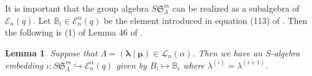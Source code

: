 \documentclass[10pt,a4,twoside,hidelinks,rm]{article}
\newcommand{\BB}{\mathbb{B}}
\newcommand{\Si}{\mathfrak{S}}
\newcommand{\E}{ {\mathcal E}_n(q)}
\newcommand{\Ea}{ {\mathcal E}_n^{\alpha}(q)}
\newcommand\blambda{{\boldsymbol\lambda}}
\newcommand\be{\mathbb{E}}
\newcommand\bmu{{\boldsymbol\mu}}
\theoremstyle{plain}
\newtheorem{lem}[teo]{Lemma}
\begin{document}
\medskip
It is important that the group algebra $ S \Si^{m}_{\Lambda} $
can be realized as a subalgebra
of $ \E$.
Let $ \BB_i \in \Ea $ be the element introduced in equation (113) of \cite{ER}.  
{\color{black}Then} the following is (1) of Lemma {\color{black} 46} of \cite{ER}.


\begin{lem}{\label{embedding}}
Suppose that $ \Lambda=(\blambda \mid \bmu) \in  {\mathcal
L}_n(\alpha) $. Then we have an $S$-algebra embedding
$\iota:S\Si^m_{\Lambda} \hookrightarrow \Ea $ given by $ B_i \mapsto \BB_i $
where $ \lambda^{(i)} = \lambda^{(i+1)} $.
\end{lem}
\end{document}
